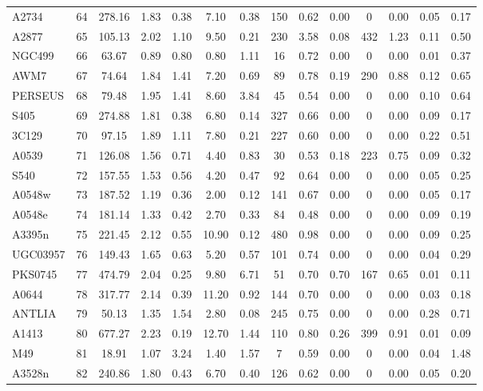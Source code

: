 \documentclass[10pt,aps,pra,reprint,amsmath,amsfonts,amssymb,showpacs,nofootinbib,floatfix]{revtex4-1}
\newcommand{\vst}{\vspace{-0.14mm}}
\begin{document}
\begin{table}
\begin{minipage}{2.0\columnwidth}
\begin{tabular}{l c c c c c c c c c c c c c}
A2734 & 64 & 278.16 & 1.83 & 0.38 & 7.10 & 0.38 & 150 & 0.62 & 0.00 & 0 & 0.00 & 0.05 & 0.17 \vst \\
A2877 & 65 & 105.13 & 2.02 & 1.10 & 9.50 & 0.21 & 230 & 3.58 & 0.08 & 432 & 1.23 & 0.11 & 0.50 \vst \\
NGC499 & 66 & 63.67 & 0.89 & 0.80 & 0.80 & 1.11 & 16 & 0.72 & 0.00 & 0 & 0.00 & 0.01 & 0.37 \vst \\
AWM7 & 67 & 74.64 & 1.84 & 1.41 & 7.20 & 0.69 & 89 & 0.78 & 0.19 & 290 & 0.88 & 0.12 & 0.65 \vst \\
PERSEUS & 68 & 79.48 & 1.95 & 1.41 & 8.60 & 3.84 & 45 & 0.54 & 0.00 & 0 & 0.00 & 0.10 & 0.64 \vst \\
S405 & 69 & 274.88 & 1.81 & 0.38 & 6.80 & 0.14 & 327 & 0.66 & 0.00 & 0 & 0.00 & 0.09 & 0.17 \vst \\
3C129 & 70 & 97.15 & 1.89 & 1.11 & 7.80 & 0.21 & 227 & 0.60 & 0.00 & 0 & 0.00 & 0.22 & 0.51 \vst \\
A0539 & 71 & 126.08 & 1.56 & 0.71 & 4.40 & 0.83 & 30 & 0.53 & 0.18 & 223 & 0.75 & 0.09 & 0.32 \vst \\
S540 & 72 & 157.55 & 1.53 & 0.56 & 4.20 & 0.47 & 92 & 0.64 & 0.00 & 0 & 0.00 & 0.05 & 0.25 \vst \\
A0548w & 73 & 187.52 & 1.19 & 0.36 & 2.00 & 0.12 & 141 & 0.67 & 0.00 & 0 & 0.00 & 0.05 & 0.17 \vst \\
A0548e & 74 & 181.14 & 1.33 & 0.42 & 2.70 & 0.33 & 84 & 0.48 & 0.00 & 0 & 0.00 & 0.09 & 0.19 \vst \\
A3395n & 75 & 221.45 & 2.12 & 0.55 & 10.90 & 0.12 & 480 & 0.98 & 0.00 & 0 & 0.00 & 0.09 & 0.25 \vst \\
UGC03957 & 76 & 149.43 & 1.65 & 0.63 & 5.20 & 0.57 & 101 & 0.74 & 0.00 & 0 & 0.00 & 0.04 & 0.29 \vst \\
PKS0745 & 77 & 474.79 & 2.04 & 0.25 & 9.80 & 6.71 & 51 & 0.70 & 0.70 & 167 & 0.65 & 0.01 & 0.11 \vst \\
A0644 & 78 & 317.77 & 2.14 & 0.39 & 11.20 & 0.92 & 144 & 0.70 & 0.00 & 0 & 0.00 & 0.03 & 0.18 \vst \\
ANTLIA & 79 & 50.13 & 1.35 & 1.54 & 2.80 & 0.08 & 245 & 0.75 & 0.00 & 0 & 0.00 & 0.28 & 0.71 \vst \\
A1413 & 80 & 677.27 & 2.23 & 0.19 & 12.70 & 1.44 & 110 & 0.80 & 0.26 & 399 & 0.91 & 0.01 & 0.09 \vst \\
M49 & 81 & 18.91 & 1.07 & 3.24 & 1.40 & 1.57 & 7 & 0.59 & 0.00 & 0 & 0.00 & 0.04 & 1.48 \vst \\
A3528n & 82 & 240.86 & 1.80 & 0.43 & 6.70 & 0.40 & 126 & 0.62 & 0.00 & 0 & 0.00 & 0.05 & 0.20 \vst \\

\end{tabular}
\end{minipage}
\end{table}
\end{document}
